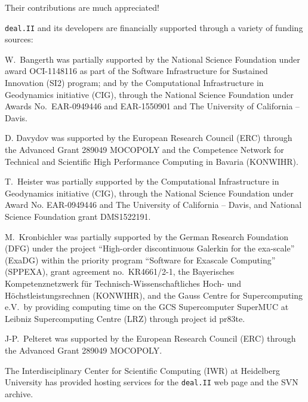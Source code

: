 \documentclass{ansarticle-preprint}
\newcommand{\specialword}[1]{\texttt{#1}}
\newcommand{\dealii}{{\specialword{deal.II}}}
\begin{document}
Their contributions are much appreciated!


\bigskip

\dealii{} and its developers are financially supported through a
variety of funding sources:

W.~Bangerth was partially
supported by the National Science Foundation under award OCI-1148116
as part of the Software Infrastructure for Sustained Innovation (SI2)
program; and by the Computational Infrastructure in Geodynamics initiative
(CIG), through the National Science Foundation under Awards
No.~EAR-0949446 and EAR-1550901 and The University of California -- Davis.

D. Davydov was supported by the European Research Council (ERC) through the Advanced Grant 289049 MOCOPOLY and the Competence Network for Technical and Scientific High Performance Computing in Bavaria (KONWIHR).

T.~Heister was partially supported by the Computational Infrastructure in
Geodynamics initiative (CIG), through the National Science Foundation
under Award No. EAR-0949446 and The University of California -- Davis, and National Science Foundation grant DMS1522191.

M.~Kronbichler was partially supported by the German Research Foundation (DFG)
under the project ``High-order discontinuous Galerkin for the exa-scale''
(ExaDG) within the priority program ``Software for Exascale Computing''
(SPPEXA), grant agreement no.~KR4661/2-1, the Bayerisches Kompetenznetzwerk
f\"ur Technisch-Wissenschaftliches Hoch- und H\"ochstleistungsrechnen
(KONWIHR), and the Gauss Centre for Supercomputing e.V.~by providing computing
time on the GCS Supercomputer SuperMUC at Leibniz Supercomputing Centre (LRZ)
through project id pr83te.

J-P.~Pelteret was supported by the European Research Council (ERC) through the Advanced Grant 289049 MOCOPOLY.

The Interdisciplinary Center for Scientific Computing (IWR) at Heidelberg University has provided
hosting services for the \dealii{} web page and the SVN archive.


{}

\end{document}
